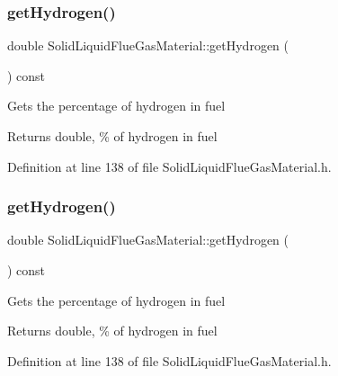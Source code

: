 \subsubsection{\texorpdfstring{get\+Hydrogen()}{getHydrogen()}\hspace{0.1cm}{\footnotesize\ttfamily [1/3]}}
{\footnotesize\ttfamily double Solid\+Liquid\+Flue\+Gas\+Material\+::get\+Hydrogen (\begin{DoxyParamCaption}{ }\end{DoxyParamCaption}) const\hspace{0.3cm}{\ttfamily [inline]}}

Gets the percentage of hydrogen in fuel \begin{DoxyReturn}{Returns}
double, \% of hydrogen in fuel 
\end{DoxyReturn}


Definition at line 138 of file Solid\+Liquid\+Flue\+Gas\+Material.\+h.

\mbox{\label{class_solid_liquid_flue_gas_material_a26af2edd53c50b071648d03bc6442fb6}} 
\subsubsection{\texorpdfstring{get\+Hydrogen()}{getHydrogen()}\hspace{0.1cm}{\footnotesize\ttfamily [2/3]}}
{\footnotesize\ttfamily double Solid\+Liquid\+Flue\+Gas\+Material\+::get\+Hydrogen (\begin{DoxyParamCaption}{ }\end{DoxyParamCaption}) const\hspace{0.3cm}{\ttfamily [inline]}}

Gets the percentage of hydrogen in fuel \begin{DoxyReturn}{Returns}
double, \% of hydrogen in fuel 
\end{DoxyReturn}


Definition at line 138 of file Solid\+Liquid\+Flue\+Gas\+Material.\+h.

\mbox{\label{class_solid_liquid_flue_gas_material_a26af2edd53c50b071648d03bc6442fb6}} 
